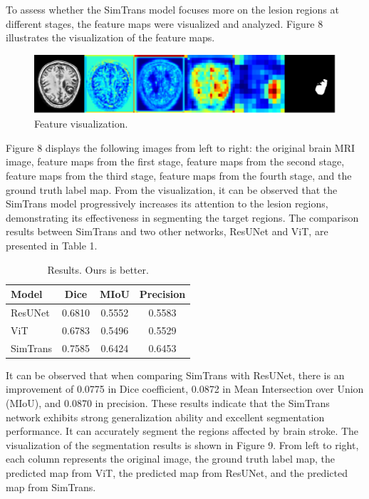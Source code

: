 \documentclass[10pt,twocolumn,letterpaper]{article}
\begin{document}
To assess whether the SimTrans model focuses more on the lesion regions at different stages, the feature maps were visualized and analyzed. Figure 8 illustrates the visualization of the feature maps.

\begin{figure}
  \begin{center}
  \includegraphics{Images/Vision.png}
  \end{center}
     \caption{Feature visualization.}
  \label{fig:vision}
\end{figure}

Figure 8 displays the following images from left to right: the original brain MRI image, feature maps from the first stage, feature maps from the second stage, feature maps from the third stage, feature maps from the fourth stage, and the ground truth label map. From the visualization, it can be observed that the SimTrans model progressively increases its attention to the lesion regions, demonstrating its effectiveness in segmenting the target regions.
The comparison results between SimTrans and two other networks, ResUNet and ViT, are presented in Table 1.

\begin{table}
  \centering
  \begin{tabular}{lccc}
    \toprule
    Model & Dice & MIoU & Precision \\
    \midrule
    ResUNet & 0.6810 & 0.5552 & 0.5583 \\
    ViT & 0.6783 & 0.5496 & 0.5529 \\
    SimTrans & 0.7585 & 0.6424 & 0.6453 \\
    \bottomrule
  \end{tabular}
  \caption{Results.   Ours is better.}
  \label{tab:result_1}
\end{table}

It can be observed that when comparing SimTrans with ResUNet, there is an improvement of 0.0775 in Dice coefficient, 0.0872 in Mean Intersection over Union (MIoU), and 0.0870 in precision. These results indicate that the SimTrans network exhibits strong generalization ability and excellent segmentation performance. It can accurately segment the regions affected by brain stroke. The visualization of the segmentation results is shown in Figure 9. From left to right, each column represents the original image, the ground truth label map, the predicted map from ViT, the predicted map from ResUNet, and the predicted map from SimTrans.
\end{document}
